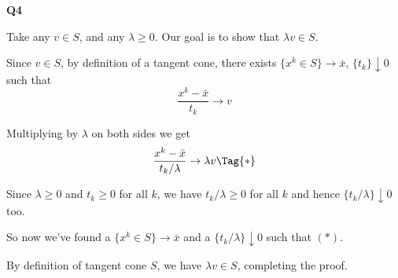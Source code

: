 %
%
%
%
%

{\large\textbf{Q4}}

Take any $v\in S$, and any $\lambda\geq0$. Our goal is to show that
$\lambda v\in S$.

Since $v\in S$, by definition of a tangent cone, there exists
$\{x^k\in S\}\to\bar x$, $\{t_k\}\downarrow0$ such that
\begin{equation*}
	\frac{x^k-\bar x}{t_k}\to v
\end{equation*}

Multiplying by $\lambda$ on both sides we get
\begin{equation*}
  \frac{x^k-\bar x}{t_k/\lambda}\to\lambda v\Tag{*}
\end{equation*}

Since $\lambda\geq0$ and $t_k\geq0$ for all $k$, we have
$t_k/\lambda\geq0$ for all $k$ and hence $\{t_k/\lambda\}\downarrow0$
too.

So now we've found a $\{x^k\in S\}\to\bar x$ and a
$\{t_k/\lambda\}\downarrow0$ such that $(*)$.
	
By definition of tangent cone $S$, we have $\lambda v\in
S$, completing the proof.
